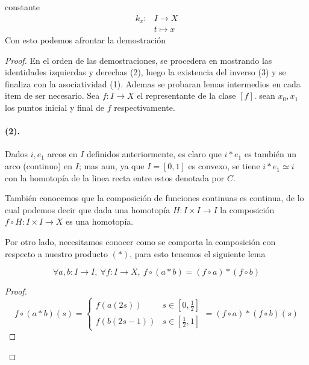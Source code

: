 constante
\begin{align*}
  k_x : &I \to X \\
        &t \mapsto x
\end{align*}
Con esto podemos afrontar la demostración
\begin{proof}
En el orden de las demostraciones, se procedera en mostrando las
identidades izquierdas y derechas (2), luego la existencia del inverso
(3) y se finaliza con la asociatividad (1). Ademas se probaran lemas
intermedios en cada item de ser necesario. Sea \(f : I
\to X\) el representante de la clase \([f]\). sean \(x_0, x_1\) los
puntos inicial y final de \(f\) respectivamente.

\paragraph{(2).} Dados \(i,e_1\) arcos en \(I\) definidos anteriormente,
es claro que \(i * e_1\) es también un arco (continuo) en \(I\); mas aun,
ya que \(I = [0,1]\) es convexo, se tiene \(i * e_1 \simeq i\) con la
homotopía de la linea recta entre estos denotada por \(C\).

También conocemos que la composición de funciones continuas es
continua, de lo cual podemos decir que dada una homotopía \(H : I \times
I \to I\) la composición \( f \circ H : I \times I \to X\) es una homotopía.

Por otro lado, necesitamos conocer como se comporta la composición con
respecto a nuestro producto \((*)\), para esto tenemos el siguiente lema
\begin{lema}
\label{lema:dist-composición-producto}
\[\forall a,b : I \to I,\ \forall f : I \to X,\ f \circ (a * b) = (f
\circ a) * (f \circ b) \]
\end{lema}
\begin{proof}
  \[ f \circ (a*b) (s) =
    \begin{cases}
      f (a(2s)) & s \in [0,\frac{1}{2}] \\
      f (b(2s - 1)) & s \in [\frac{1}{2} , 1]
    \end{cases}
    = (f \circ a) * (f \circ b) (s)
  \]
\end{proof}


\end{proof}
